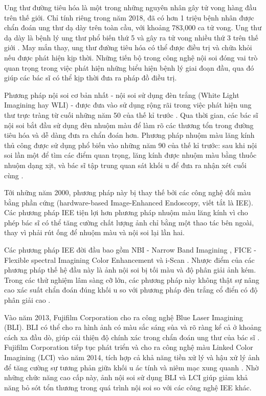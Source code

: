 \documentclass[12pt]{extreport}
\begin{document}
Ung thư đường tiêu hóa là một trong những nguyên nhân gây tử vong hàng đầu trên thế giới. Chỉ tính riêng trong năm 2018, đã có hơn 1 triệu bệnh nhân được chẩn đoán ung thư dạ dày trên toàn cầu, với khoảng 783,000 ca tử vong. Ung thư dạ dày là bệnh lý ung thư phổ biến thứ 5 và gây ra tử vong nhiều thứ 3 trên thế giới \cite{https://doi.org/10.3322/caac.21492}. May mắn thay, ung thư đường tiêu hóa có thể được điều trị và chữa khỏi nếu được phát hiện kịp thời. Những tiến bộ trong công nghệ nội soi đóng vai trò quan trọng trong việc phát hiện những biểu hiện bệnh lý giai đoạn đầu, qua đó giúp các bác sĩ có thể kịp thời đưa ra pháp đồ điều trị.

Phương pháp nội soi cơ bản nhất - nội soi sử dụng đèn trắng (White Light Imagining hay WLI) - được đưa vào sử dụng rộng rãi trong việc phát hiện ung thư trực tràng từ cuối những năm 50 của thế kỉ trước \cite{pmid26668791}. Qua thời gian, các bác sĩ nội soi bắt đầu sử dụng đèn nhuộm màu để làm rõ các thương tổn trong đường tiêu hóa và dễ dàng đưa ra chẩn đoán hơn. Phương pháp nhuộm màu lăng kính thủ công được sử dụng phổ biến vào những năm 90 của thế kỉ trước: sau khi nội soi lần một để tìm các điểm quan trọng, lăng kính được nhuộm màu bằng thuốc nhuộm dạng xịt, và bác sĩ tập trung quan sát khối u để đưa ra nhận xét cuối cùng \cite{pmid10613481}.

Tới những năm 2000, phương pháp này bị thay thế bởi các công nghệ đổi màu bằng phần cứng (hardware-based Image-Enhanced Endoscopy, viết tắt là IEE). Các phương pháp IEE tiện lợi hơn phương pháp nhuộm màu lăng kính vì cho phép bác sĩ có thể tăng cường chất lượng ảnh chỉ bằng một thao tác bên ngoài, thay vì phải rút ống để nhuộm màu và nội soi lại lần hai.

Các phương pháp IEE đời đầu bao gồm NBI - Narrow Band Imagining \cite{pmid15578301}, FICE - Flexible spectral Imagining Color Enhancement \cite{TOGASHI2009734} và i-Scan \cite{HOFFMAN201045}. Nhược điểm của các phương pháp thế hệ đầu này là ảnh nội soi bị tối màu và độ phân giải ảnh kém. Trong các thử nghiệm lâm sàng cỡ lớn, các phương pháp này không thật sự nâng cao xác suất chẩn đoán đúng khối u so với phương pháp đèn trắng cổ điển có độ phân giải cao \cite{REX200742} \cite{pmid20628363}.

Vào năm 2013, Fujifilm Corporation cho ra công nghệ Blue Laser Imagining (BLI). BLI có thể cho ra hình ảnh có màu sắc sáng sủa và rõ ràng kể cả ở khoảng cách xa đầu dò, giúp cải thiện độ chính xác trong chẩn đoán ung thư của bác sĩ \cite{pmid24373002}. Fujifilm Corporation tiếp tục phát triển và cho ra công nghệ màu Linked Color Imagining (LCI) vào năm 2014, tích hợp cả khả năng tiền xử lý và hậu xử lý ảnh để tăng cường sự tương phản giữa khối u ác tính và niêm mạc xung quanh \cite{pmid30291440}. Nhờ những chức năng cao cấp này, ảnh nội soi sử dụng BLI và LCI giúp giảm khả năng bỏ sót tổn thương trong quá trình nội soi so với các công nghệ IEE khác.
\end{document}

